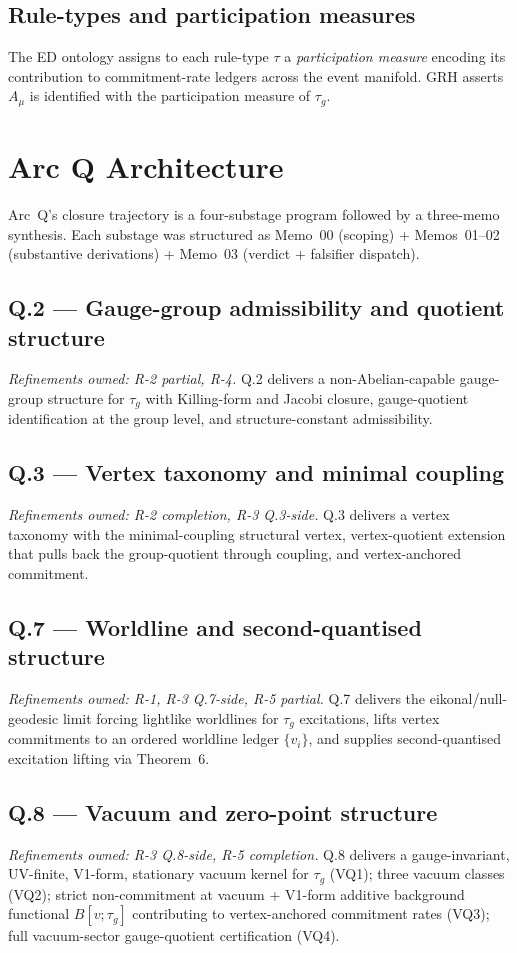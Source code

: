 \documentclass[11pt,a4paper]{article}
\begin{document}
\subsection{Rule-types and participation measures}

The ED ontology assigns to each rule-type $\tau$ a \emph{participation measure} encoding its contribution to commitment-rate ledgers across the event manifold. GRH asserts $A_\mu$ is identified with the participation measure of $\tau_g$.

\section{Arc Q Architecture}

Arc~Q's closure trajectory is a four-substage program followed by a three-memo synthesis. Each substage was structured as Memo~00 (scoping) + Memos~01--02 (substantive derivations) + Memo~03 (verdict + falsifier dispatch).

\subsection{Q.2 --- Gauge-group admissibility and quotient structure}
\textit{Refinements owned: R-2 partial, R-4.} Q.2 delivers a non-Abelian-capable gauge-group structure for $\tau_g$ with Killing-form and Jacobi closure, gauge-quotient identification at the group level, and structure-constant admissibility.

\subsection{Q.3 --- Vertex taxonomy and minimal coupling}
\textit{Refinements owned: R-2 completion, R-3 Q.3-side.} Q.3 delivers a vertex taxonomy with the minimal-coupling structural vertex, vertex-quotient extension that pulls back the group-quotient through coupling, and vertex-anchored commitment.

\subsection{Q.7 --- Worldline and second-quantised structure}
\textit{Refinements owned: R-1, R-3 Q.7-side, R-5 partial.} Q.7 delivers the eikonal/null-geodesic limit forcing lightlike worldlines for $\tau_g$ excitations, lifts vertex commitments to an ordered worldline ledger $\{v_i\}$, and supplies second-quantised excitation lifting via Theorem~6.

\subsection{Q.8 --- Vacuum and zero-point structure}
\textit{Refinements owned: R-3 Q.8-side, R-5 completion.} Q.8 delivers a gauge-invariant, UV-finite, V1-form, stationary vacuum kernel for $\tau_g$ (VQ1); three vacuum classes (VQ2); strict non-commitment at vacuum + V1-form additive background functional $B[v;\tau_g]$ contributing to vertex-anchored commitment rates (VQ3); full vacuum-sector gauge-quotient certification (VQ4).
\end{document}
